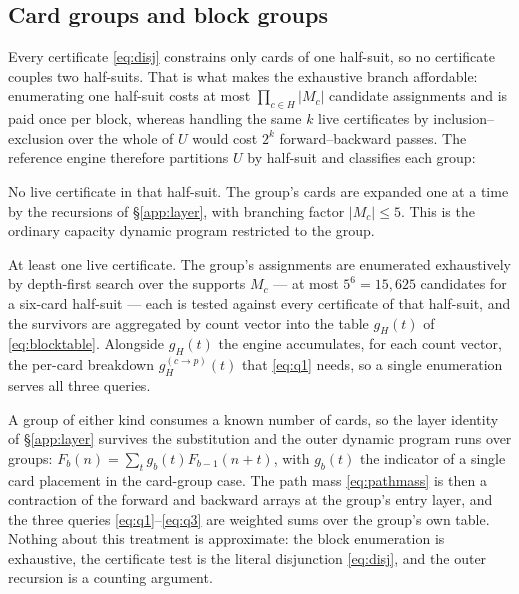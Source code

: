 \subsection{Card groups and block groups}
\label{app:groups}

Every certificate \eqref{eq:disj} constrains only cards of one half-suit, so no
certificate couples two half-suits. That is what makes the exhaustive branch
affordable: enumerating one half-suit costs at most $\prod_{c \in H}|M_c|$
candidate assignments and is paid once per block, whereas handling the same $k$
live certificates by inclusion--exclusion over the whole of $U$ would cost $2^k$
forward--backward passes. The reference engine therefore partitions $U$
by half-suit and classifies each group:

\begin{description}[style=nextline]
  \item[Card group.] No live certificate in that half-suit. The group's cards are
        expanded one at a time by the recursions of \S\ref{app:layer}, with
        branching factor $|M_c| \le 5$. This is the ordinary capacity dynamic
        program restricted to the group.
  \item[Block group.] At least one live certificate. The group's assignments are
        enumerated exhaustively by depth-first search over the supports $M_c$ ---
        at most $5^6 = 15{,}625$ candidates for a six-card half-suit --- each is
        tested against every certificate of that half-suit, and the survivors are
        aggregated by count vector into the table $g_H(t)$ of
        \eqref{eq:blocktable}. Alongside $g_H(t)$ the engine accumulates, for
        each count vector, the per-card breakdown $g_H^{(c\to p)}(t)$ that
        \eqref{eq:q1} needs, so a single enumeration serves all three queries.
\end{description}

A group of either kind consumes a known number of cards, so the layer identity of
\S\ref{app:layer} survives the substitution and the outer dynamic program runs
over groups: $F_b(n) = \sum_t g_b(t) F_{b-1}(n+t)$, with $g_b(t)$ the indicator
of a single card placement in the card-group case. The path mass
\eqref{eq:pathmass} is then a contraction of the forward and backward arrays at
the group's entry layer, and the three queries \eqref{eq:q1}--\eqref{eq:q3} are
weighted sums over the group's own table. Nothing about this treatment is
approximate: the block enumeration is exhaustive, the certificate test is the
literal disjunction \eqref{eq:disj}, and the outer recursion is a counting
argument.

